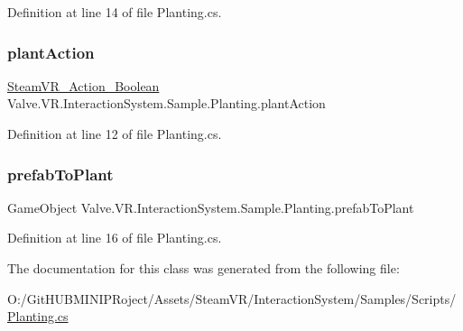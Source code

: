 Definition at line 14 of file Planting.\+cs.

\mbox{\label{class_valve_1_1_v_r_1_1_interaction_system_1_1_sample_1_1_planting_a8b25594c76fa85d1e63c4248c082491a}} 
\subsubsection{\texorpdfstring{plantAction}{plantAction}}
{\footnotesize\ttfamily \mbox{\hyperlink{class_valve_1_1_v_r_1_1_steam_v_r___action___boolean}{Steam\+V\+R\+\_\+\+Action\+\_\+\+Boolean}} Valve.\+V\+R.\+Interaction\+System.\+Sample.\+Planting.\+plant\+Action}



Definition at line 12 of file Planting.\+cs.

\mbox{\label{class_valve_1_1_v_r_1_1_interaction_system_1_1_sample_1_1_planting_a9581cc8bf1a84a1eb581616abc3b14a0}} 
\subsubsection{\texorpdfstring{prefabToPlant}{prefabToPlant}}
{\footnotesize\ttfamily Game\+Object Valve.\+V\+R.\+Interaction\+System.\+Sample.\+Planting.\+prefab\+To\+Plant}



Definition at line 16 of file Planting.\+cs.



The documentation for this class was generated from the following file\+:\begin{DoxyCompactItemize}
\item 
O\+:/\+Git\+H\+U\+B\+M\+I\+N\+I\+P\+Roject/\+Assets/\+Steam\+V\+R/\+Interaction\+System/\+Samples/\+Scripts/\mbox{\hyperlink{_planting_8cs}{Planting.\+cs}}\end{DoxyCompactItemize}
